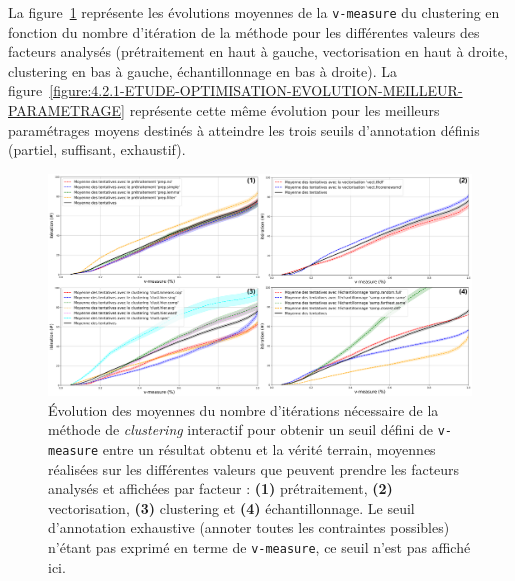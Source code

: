 		
			La figure~\ref{figure:4.2.1-ETUDE-OPTIMISATION-EVOLUTION-PAR-FACTEURS} représente les évolutions moyennes de la \texttt{v-measure} du clustering en fonction du nombre d'itération de la méthode pour les différentes valeurs des facteurs analysés (prétraitement en haut à gauche, vectorisation en haut à droite, clustering en bas à gauche, échantillonnage en bas à droite).
			La figure~\ref{figure:4.2.1-ETUDE-OPTIMISATION-EVOLUTION-MEILLEUR-PARAMETRAGE} représente cette même évolution pour les meilleurs paramétrages moyens destinés à atteindre les trois seuils d'annotation définis (partiel, suffisant, exhaustif).
			\begin{figure}[!htb]
				\centering
				\includegraphics[width=\textwidth]{figures/etude-efficience-evolution-moyenne-par-vmeasure-par-facteur}
				\caption{Évolution des moyennes du nombre d'itérations nécessaire de la méthode de \textit{clustering} interactif pour obtenir un seuil défini de \texttt{v-measure} entre un résultat obtenu et la vérité terrain, moyennes réalisées sur les différentes valeurs que peuvent prendre les facteurs analysés et affichées par facteur : \textbf{(1)} prétraitement, \textbf{(2)} vectorisation, \textbf{(3)} clustering et \textbf{(4)} échantillonnage. Le seuil d'annotation exhaustive (annoter toutes les contraintes possibles) n'étant pas exprimé en terme de \texttt{v-measure}, ce seuil n'est pas affiché ici.}
				\label{figure:4.2.1-ETUDE-OPTIMISATION-EVOLUTION-PAR-FACTEURS}
			\end{figure}
